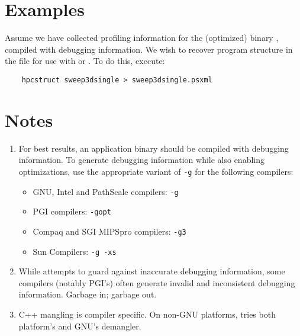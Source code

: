 \documentclass[english]{article}
\begin{document}
\section{Examples}

Assume we have collected profiling information for the (optimized) binary , compiled with debugging information.
We wish to recover program structure in the file  for use with  or .
To do this, execute:
\begin{verbatim}
    hpcstruct sweep3dsingle > sweep3dsingle.psxml
\end{verbatim}


\section{Notes}

\begin{enumerate}

\item For best results, an application binary should be compiled with debugging information.
To generate debugging information while also enabling optimizations, use the appropriate variant of \verb+-g+ for the following compilers:
\begin{itemize}
\item GNU, Intel and PathScale compilers: \verb+-g+
\item PGI compilers: \verb+-gopt+
\item Compaq and SGI MIPSpro compilers: \verb+-g3+
\item Sun Compilers: \verb+-g -xs+
\end{itemize}

\item While  attempts to guard against inaccurate debugging information, some compilers (notably PGI's) often generate invalid and inconsistent debugging information.
Garbage in; garbage out.

\item C++ mangling is compiler specific. On non-GNU platforms, 
tries both platform's and GNU's demangler.

\end{enumerate}
\end{document}
